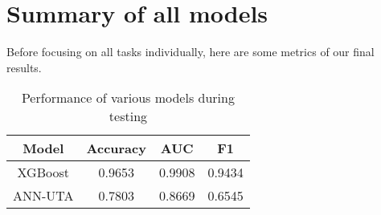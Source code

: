 \documentclass[../main.tex]{subfiles}
\begin{document}
\section{Summary of all models}
Before focusing on all tasks individually, here are some metrics of our final
results.

\begin{table}[H]
	\begin{center}
		\begin{tabular}{c||c|c|c}
			\hline
			Model & Accuracy & AUC & F1 \\
			\hline
			\hline
			XGBoost & 0.9653 & 0.9908 & 0.9434 \\
			ANN-UTA & 0.7803 & 0.8669 & 0.6545 \\
			\hline
		\end{tabular}
		\caption{Performance of various models during testing}
		\label{table:perf}
	\end{center}
\end{table}
\end{document}
